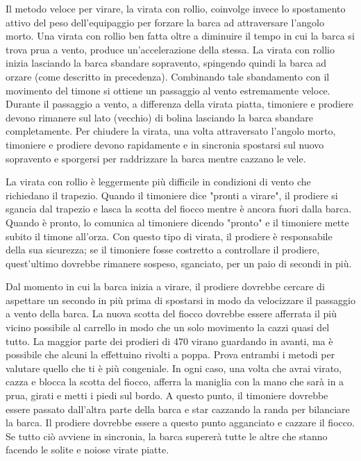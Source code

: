 Il metodo veloce per virare, la virata con rollio, coinvolge invece lo
spostamento attivo del peso dell'equipaggio per forzare la barca ad attraversare
l'angolo morto. Una virata con rollio ben fatta oltre a diminuire il tempo in
cui la barca si trova prua a vento, produce un'accelerazione della stessa. La
virata con rollio inizia lasciando la barca sbandare sopravento, spingendo
quindi la barca ad orzare (come descritto in precedenza). Combinando tale
sbandamento con il movimento del timone si ottiene un passaggio al vento
estremamente veloce. Durante il passaggio a vento, a differenza della virata
piatta, timoniere e prodiere devono rimanere sul lato (vecchio) di bolina
lasciando la barca sbandare completamente. Per chiudere la virata, una volta
attraversato l'angolo morto, timoniere e prodiere devono rapidamente e in
sincronia spostarsi sul nuovo sopravento e sporgersi per raddrizzare la barca mentre cazzano le
vele.

La virata con rollio è leggermente più difficile in condizioni di vento che
richiedano il trapezio. Quando il timoniere dice "pronti a virare", il prodiere
si sgancia dal trapezio e lasca la scotta del fiocco mentre è ancora fuori dalla
barca. Quando è pronto, lo comunica al timoniere dicendo "pronto" e il timoniere mette subito il
timone all'orza. Con questo tipo di virata, il prodiere è responsabile della sua
sicurezza; se il timoniere fosse costretto a controllare il prodiere,
quest'ultimo dovrebbe rimanere sospeso, sganciato, per un paio di secondi in
più.

Dal momento in cui la barca inizia a virare, il prodiere dovrebbe cercare di
aspettare un secondo in più prima di spostarsi in modo da velocizzare il
passaggio a vento della barca. La nuova scotta del fiocco dovrebbe essere afferrata il
più vicino possibile al carrello in modo che un solo movimento la cazzi quasi
del tutto. La maggior parte dei prodieri di 470 virano guardando in avanti, ma è
possibile che alcuni la effettuino rivolti a poppa. Prova entrambi i metodi
per valutare quello che ti è più congeniale. In ogni caso, una volta che avrai virato,
cazza e blocca la scotta del fiocco, afferra la maniglia con la mano che sarà in
a prua, girati e metti i piedi sul bordo. A questo punto, il timoniere dovrebbe
essere passato dall'altra parte della barca e star cazzando la randa per
bilanciare la barca. Il prodiere dovrebbe essere a questo punto agganciato e cazzare il fiocco.
Se tutto ciò avviene in sincronia, la barca supererà tutte le altre che stanno
facendo le solite e noiose virate piatte.

